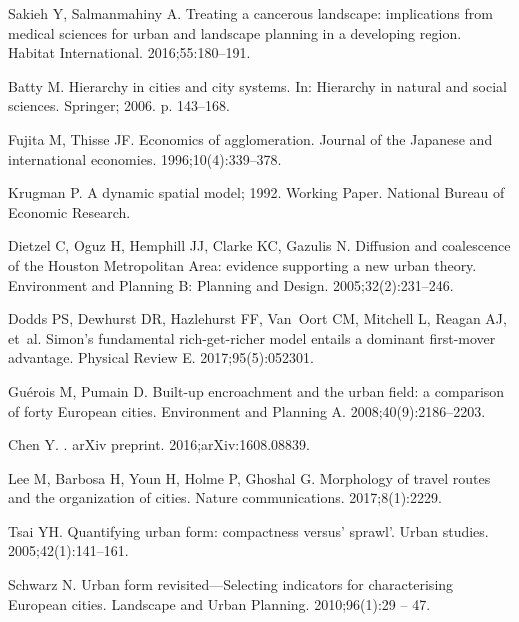 \documentclass[10pt,letterpaper]{article}
\begin{document}
\begin{thebibliography}{10}
Sakieh Y, Salmanmahiny A.
\newblock Treating a cancerous landscape: implications from medical sciences
  for urban and landscape planning in a developing region.
\newblock Habitat International. 2016;55:180--191.

Batty M.
\newblock Hierarchy in cities and city systems.
\newblock In: Hierarchy in natural and social sciences. Springer; 2006. p.
  143--168.

Fujita M, Thisse JF.
\newblock Economics of agglomeration.
\newblock Journal of the Japanese and international economies.
  1996;10(4):339--378.

Krugman P. A dynamic spatial model; 1992.
\newblock Working Paper. National Bureau of Economic Research.

Dietzel C, Oguz H, Hemphill JJ, Clarke KC, Gazulis N.
\newblock Diffusion and coalescence of the Houston Metropolitan Area: evidence
  supporting a new urban theory.
\newblock Environment and Planning B: Planning and Design. 2005;32(2):231--246.

Dodds PS, Dewhurst DR, Hazlehurst FF, Van~Oort CM, Mitchell L, Reagan AJ,
  et~al.
\newblock Simon's fundamental rich-get-richer model entails a dominant
  first-mover advantage.
\newblock Physical Review E. 2017;95(5):052301.

Gu{\'e}rois M, Pumain D.
\newblock Built-up encroachment and the urban field: a comparison of forty
  European cities.
\newblock Environment and Planning A. 2008;40(9):2186--2203.

{Chen} Y.
.
\newblock arXiv preprint. 2016;arXiv:1608.08839.

Lee M, Barbosa H, Youn H, Holme P, Ghoshal G.
\newblock Morphology of travel routes and the organization of cities.
\newblock Nature communications. 2017;8(1):2229.

Tsai YH.
\newblock Quantifying urban form: compactness versus' sprawl'.
\newblock Urban studies. 2005;42(1):141--161.

Schwarz N.
\newblock Urban form revisited---Selecting indicators for characterising
  European cities.
\newblock Landscape and Urban Planning. 2010;96(1):29 -- 47.


\end{thebibliography}
\end{document}
